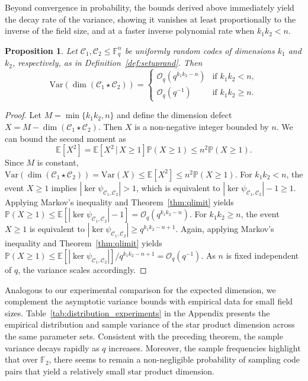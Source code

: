 \documentclass[a4paper,11pt,reqno]{article}
\newcommand{\F}{\mathbb{F}}
\newcommand{\C}{\mathcal{C}}
\theoremstyle{plain} \numberwithin{equation}{section}
\newtheorem{proposition}[theorem]{Proposition}
\theoremstyle{definition}
\begin{document}
{ 
Beyond convergence in probability, the bounds derived above immediately yield the decay rate of the variance, showing it vanishes at least proportionally to the inverse of the field size, and at a faster inverse polynomial rate when $k_1k_2 < n$.

\begin{proposition} \label{prop:variance_q}
    Let $\C_1, \C_2 \leq \F_q^n$ be uniformly random codes of dimensions $k_1$ and $k_2$, respectively, as in Definition~\ref{def:setuprand}. Then
    $$
        \mathrm{Var}(\dim (\C_1\star \C_2)) = \begin{cases}
            \mathcal{O}_q(q^{k_1k_2-n}) & \text{if } k_1k_2 < n, \\
            \mathcal{O}_q(q^{-1}) & \text{if } k_1k_2 \geq n.
        \end{cases}
    $$
\end{proposition}
\begin{proof}
    Let $M=\min\{k_1k_2,n\}$ and define the dimension defect $X=M-\dim(\C_1 \star \C_2)$. Then $X$ is a non-negative integer bounded by $n$. We can bound the second moment as
    $$
        \mathbb{E}[X^2] = \mathbb{E}[X^2 \,|\, X\geq 1] \mathbb{P}(X\geq 1) \leq n^2 \mathbb{P}(X\geq 1).
    $$
    Since $M$ is constant, $\mathrm{Var}(\dim(\C_1\star \C_2)) = \mathrm{Var}(X)\leq \mathbb{E}[X^2] \leq n^2\mathbb{P}(X \geq 1)$. For $k_1k_2 < n$, the event $X \geq 1$ implies $|\ker \psi_{\C_1,\C_2}| > 1$, which is equivalent to $|\ker \psi_{\C_1,\C_2}| - 1 \geq 1$. Applying Markov's inequality and Theorem~\ref{thm:qlimit} yields $\mathbb{P}(X \geq 1) \leq \mathbb{E}[|\ker \psi_{\C_1,\C_2}| - 1] = \mathcal{O}_q(q^{k_1k_2-n})$. For $k_1k_2 \geq n$, the event $X \geq 1$ is equivalent to $|\ker \psi_{\C_1,\C_2}| \geq q^{k_1k_2-n+1}$. Again, applying Markov's inequality and Theorem~\ref{thm:qlimit} yields $\mathbb{P}(X \geq 1) \leq \mathbb{E}[|\ker \psi_{\C_1,\C_2}|] / q^{k_1k_2-n+1} = \mathcal{O}_q(q^{-1})$. As $n$ is fixed independent of $q$, the variance scales accordingly.
\end{proof}

Analogous to our experimental comparison for the expected dimension, we complement the asymptotic variance bounds with empirical data for small field sizes. Table~\ref{tab:distribution_experiments} in the Appendix presents the empirical distribution and sample variance of the star product dimension across the same parameter sets. Consistent with the preceding theorem, the sample variance decays rapidly as $q$ increases. Moreover, the sample frequencies highlight that over $\F_2$, there seems to remain a non-negligible probability of sampling code pairs that yield a relatively small star product dimension.
}
\end{document}
